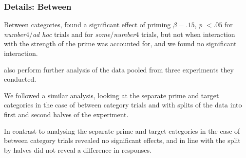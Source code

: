 \documentclass[noamssymb]{beamer}
\begin{document}
\begin{frame}
  \frametitle{{\ftf Details: Between}}

  Between categories, \citeauthor{Bott:2016aa} found a significant effect of priming \(\beta = .15\), \emph{p} \(< .05\) for \emph{number}4/\emph{ad hoc} trials and for \emph{some}/\emph{number}4 trials, but not when interaction with the strength of the prime was accounted for, and we found no significant interaction.

  \citeauthor{Bott:2016aa} also perform further analysis of the data pooled from three experiments they conducted.

  We followed a similar analysis, looking at the separate prime and target categories in the case of between category trials and with splits of the data into first and second halves of the experiment.

  In contrast to \citeauthor{Bott:2016aa} analysing the separate prime and target categories in the case of between category trials revealed no significant effects, and in line with \citeauthor{Bott:2016aa} the split by halves did not reveal a difference in responses.

\end{frame}
\end{document}
